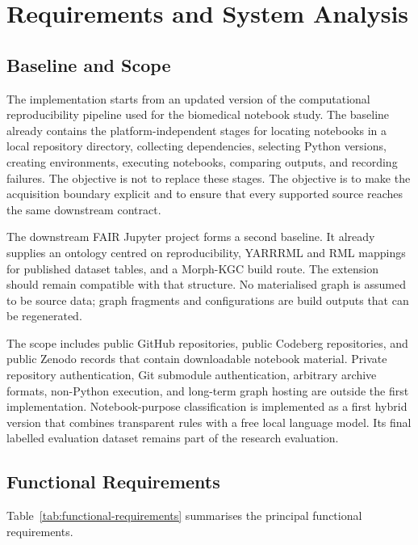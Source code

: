 \chapter{Requirements and System Analysis}
\label{chap:requirements}

\section{Baseline and Scope}

The implementation starts from an updated version of the computational reproducibility pipeline used for the biomedical notebook study. The baseline already contains the platform-independent stages for locating notebooks in a local repository directory, collecting dependencies, selecting Python versions, creating environments, executing notebooks, comparing outputs, and recording failures. The objective is not to replace these stages. The objective is to make the acquisition boundary explicit and to ensure that every supported source reaches the same downstream contract.

The downstream FAIR Jupyter project forms a second baseline. It already supplies an ontology centred on reproducibility, YARRRML and RML mappings for published dataset tables, and a Morph-KGC build route. The extension should remain compatible with that structure. No materialised graph is assumed to be source data; graph fragments and configurations are build outputs that can be regenerated.

The scope includes public GitHub repositories, public Codeberg repositories, and public Zenodo records that contain downloadable notebook material. Private repository authentication, Git submodule authentication, arbitrary archive formats, non-Python execution, and long-term graph hosting are outside the first implementation. Notebook-purpose classification is implemented as a first hybrid version that combines transparent rules with a free local language model. Its final labelled evaluation dataset remains part of the research evaluation.

\section{Functional Requirements}

Table~\ref{tab:functional-requirements} summarises the principal functional requirements.


